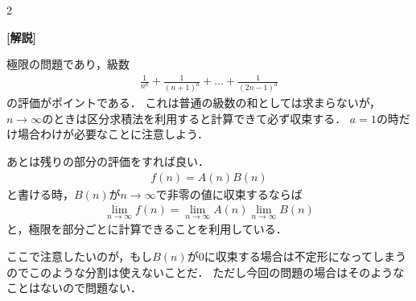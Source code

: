 \documentclass[../../main.tex]{subfiles}
\begin{document}
\begin{multicols}{2}
  \vspace{10pt}

  {\bf[解説]}

  極限の問題であり，級数
  \begin{align*}
    \frac{1}{n^a} + \frac{1}{(n+1)^a} + \dots + \frac{1}{(2n-1)^a}
  \end{align*}
  の評価がポイントである．
  これは普通の級数の和としては求まらないが，$n\to\infty$のときは区分求積法を利用すると計算できて必ず収束する．
  $a=1$の時だけ場合わけが必要なことに注意しよう．

  あとは残りの部分の評価をすれば良い．
  \begin{align*}
    f(n) = A(n)B(n)
  \end{align*}
  と書ける時，$B(n)$が$n\to\infty$で非零の値に収束するならば
  \begin{align*}
    \lim_{n\to\infty} f(n) = \lim_{n\to\infty}A(n) \lim_{n\to\infty}B(n)
  \end{align*}
  と，極限を部分ごとに計算できることを利用している．

  ここで注意したいのが，もし$B(n)$が$0$に収束する場合は不定形になってしまうのでこのような分割は使えないことだ．
  ただし今回の問題の場合はそのようなことはないので問題ない．

  \newpage
\end{multicols}
\end{document}
